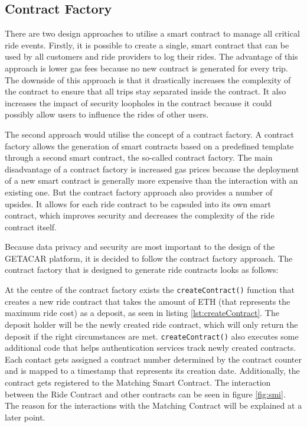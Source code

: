 \subsection{Contract Factory}
There are two design approaches to utilise a smart contract to manage all critical ride events. Firstly, it is possible to create a single, smart contract that can be used by all customers and ride providers to log their rides. The advantage of this approach is lower gas fees because no new contract is generated for every trip. The downside of this approach is that it drastically increases the complexity of the contract to ensure that all trips stay separated inside the contract. It also increases the impact of security loopholes in the contract because it could possibly allow users to influence the rides of other users. 

The second approach would utilise the concept of a contract factory. A contract factory allows the generation of smart contracts based on a predefined template through a second smart contract, the so-called contract factory. The main disadvantage of a contract factory is increased gas prices because the deployment of a new smart contract is generally more expensive than the interaction with an existing one. But the contract factory approach also provides a number of upsides. It allows for each ride contract to be capsuled into its own smart contract, which improves security and decreases the complexity of the ride contract itself. 

Because data privacy and security are most important to the design of the GETACAR platform, it is decided to follow the contract factory approach. The contract factory that is designed to generate ride contracts looks as follows:

At the centre of the contract factory exists the \texttt{createContract()} function that creates a new ride contract that takes the amount of ETH (that represents the maximum ride cost) as a deposit, as seen in listing \ref{lst:createContract}. The deposit holder will be the newly created ride contract, which will only return the deposit if the right circumstances are met. \texttt{createContract()} also executes some additional code that helps authentication services track newly created contracts. Each contact gets assigned a contract number determined by the contract counter and is mapped to a timestamp that represents its creation date. Additionally, the contract gets registered to the Matching Smart Contract. The interaction between the Ride Contract and other contracts can be seen in figure \ref{fig:smi}. The reason for the interactions with the Matching Contract will be explained at a later point.

